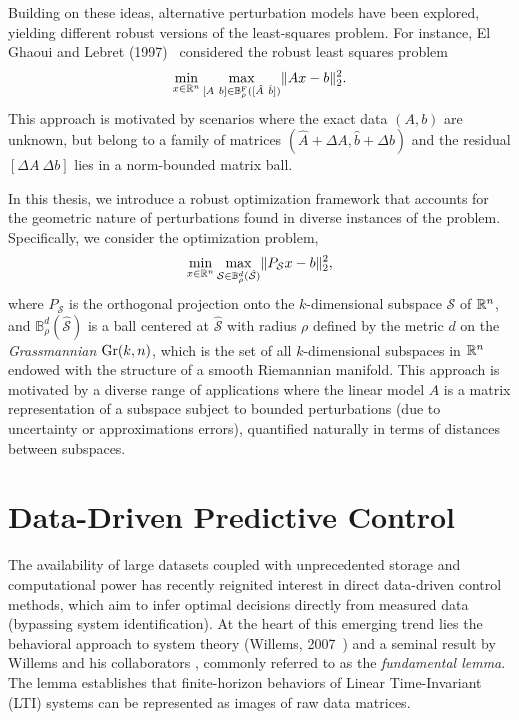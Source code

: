 Building on these ideas, alternative perturbation models have been explored, yielding different robust versions of the least-squares problem. For instance, El Ghaoui and Lebret (1997)~\cite{ghaoui97} considered the robust least squares problem
\begin{equation}
    \min_{x \in \mathbb{R}^n} \max_{[A \ b] \in \mathbb{B}^{\textrm{F}}_{\rho}([\hat{A} \ \hat{b}])} \lVert Ax - b \rVert_2^2.
\end{equation}
This approach is motivated by scenarios where the exact data $(A,b)$ are unknown, but belong to a family of matrices $(\hat{A} + \Delta A , \hat{b} + \Delta b)$ and the residual $[\Delta A \ \Delta b]$ lies in a norm-bounded matrix ball.

In this thesis, we introduce a robust optimization framework that accounts for the geometric nature of perturbations found in diverse instances of the problem. Specifically, we consider the optimization problem,
\begin{equation}
    \min_{x \in \mathbb{R}^n} \max_{\mathcal{S} \in \mathbb{B}^d_{\rho}(\hat{\mathcal{S}})} \lVert P_{\mathcal{S}} x - b \rVert_2^2,
\end{equation}
where $P_{\mathcal{S}}$ is the orthogonal projection onto the $k$-dimensional subspace $\mathcal{S}$ of $\mathbb{R}^n$, and $\mathbb{B}^d_{\rho}(\hat{\mathcal{S}})$ is a ball centered at $\hat{\mathcal{S}}$ with radius $\rho$ defined by the metric $d$ on the \textit{Grassmannian} $\text{Gr}(k,n)$, which is  the set of all $k$-dimensional subspaces in $\mathbb{R}^n$ endowed with the structure of a smooth Riemannian manifold. This approach is motivated by a diverse range of applications where the linear model $A$ is a matrix representation of a subspace subject to bounded perturbations (due to uncertainty or approximations errors), quantified naturally in terms of distances between subspaces.

\section{Data-Driven Predictive Control}

The availability of large datasets coupled with unprecedented storage and computational power has recently reignited interest in direct data-driven control methods, which aim to infer optimal decisions directly from measured data (bypassing system identification). At the heart of this emerging trend lies the behavioral approach to system theory (Willems, 2007~\cite{willems2007}) and a seminal result by Willems and his collaborators \cite{willems2005}, commonly referred to as the \textit{fundamental lemma}. The lemma establishes that finite-horizon behaviors of Linear Time-Invariant (LTI) systems can be represented as images of raw data matrices. 

